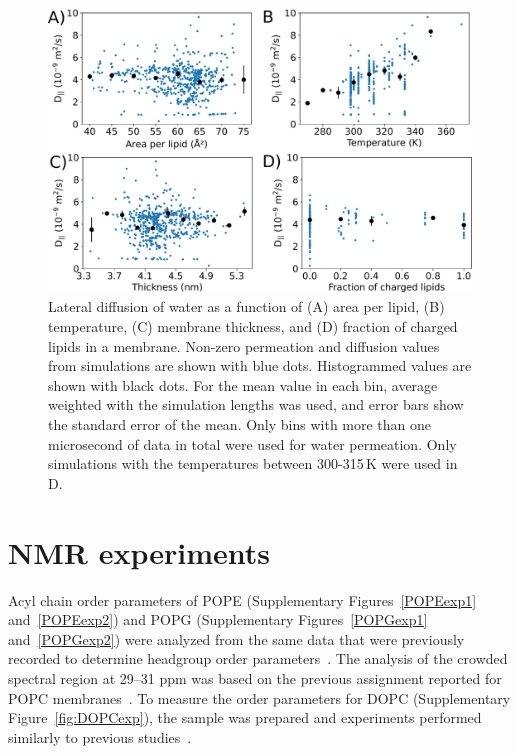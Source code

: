 \documentclass[fleqn,10pt]{wlscirepSI}
\begin{document}
\begin{figure}[!h]
    \centering
    \includegraphics[width = \textwidth]{Figures/LateralDiffusionSI.pdf}
    \caption{Lateral diffusion of water as a function of (A) area per lipid, (B) temperature, (C) membrane thickness, and (D) fraction of charged lipids in a membrane. Non-zero permeation and diffusion values from simulations are shown with blue dots. Histogrammed values are shown with black dots. For the mean value in each bin, average weighted with the simulation lengths was used, and error bars show the standard error of the mean. Only bins with more than one microsecond of data in total were used for water permeation. Only simulations with the temperatures between 300-315\,K were used in D.}
    \label{fig:diffusionSI}
\end{figure}

\pagebreak


\clearpage
\section*{NMR experiments}
Acyl chain order parameters of POPE (Supplementary Figures~\ref{POPEexp1} and~\ref{POPEexp2}) and POPG (Supplementary Figures~\ref{POPGexp1} and~\ref{POPGexp2}) were analyzed from the same data that were previously recorded to determine headgroup order parameters~\cite{bacle21}. The analysis of the crowded spectral region at 29--31 ppm was based on the previous assignment reported for POPC membranes~\cite{ferreira13}. To measure the order parameters for DOPC (Supplementary Figure~\ref{fig:DOPCexp}), the sample was prepared and experiments performed similarly to previous studies~\cite{bacle21}.
\end{document}
